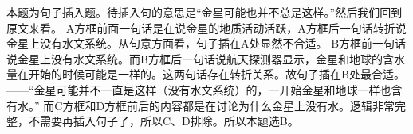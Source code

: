 \begin{blk}
    \begin{nlz}
        本题为句子插入题。待插入句的意思是“金星可能也并不总是这样。”然后我们回到原文来看。 A方框前面一句话是在说金星的地质活动活跃，A方框后一句话转折说金星上没有水文系统。从句意方面看，句子插在A处显然不合适。 B方框前一句话说金星上没有水文系统。而B方框后一句话说航天探测器显示，金星和地球的含水量在开始的时候可能是一样的。这两句话存在转折关系。故句子插在B处最合适。——“金星可能并不一直是这样（没有水文系统）的，一开始金星和地球一样也含有水。” 而C方框和D方框前后的内容都是在讨论为什么金星上没有水。逻辑非常完整，不需要再插入句子了，所以C、D排除。所以本题选B。
    \end{nlz}
\end{blk}